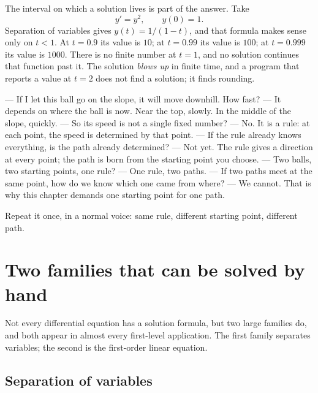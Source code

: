 The interval on which a solution lives is part of the answer. Take
\[
y'=y^{2},\qquad y(0)=1 .
\]
Separation of variables gives $y(t)=1/(1-t)$, and that formula makes sense only on $t<1$.
At $t=0.9$ its value is $10$; at $t=0.99$ its value is $100$; at $t=0.999$ its value is
$1000$. There is no finite number at $t=1$, and no solution continues that function past it.
The solution \emph{blows up} in finite time, and a program that reports a value at $t=2$ does
not find a solution; it finds rounding.



\begin{bacakeras}
--- If I let this ball go on the slope, it will move downhill. How fast?
--- It depends on where the ball is now. Near the top, slowly. In the middle of the slope,
quickly.
--- So its speed is not a single fixed number?
--- No. It is a rule: at each point, the speed is determined by that point.
--- If the rule already knows everything, is the path already determined?
--- Not yet. The rule gives a direction at every point; the path is born from the starting
point you choose.
--- Two balls, two starting points, one rule?
--- One rule, two paths.
--- If two paths meet at the same point, how do we know which one came from where?
--- We cannot. That is why this chapter demands one starting point for one path.

Repeat it once, in a normal voice: same rule, different starting point, different path.
\end{bacakeras}

\section{Two families that can be solved by hand}

Not every differential equation has a solution formula, but two large families do, and both
appear in almost every first-level application. The first family separates variables; the
second is the first-order linear equation.

\subsection{Separation of variables}

